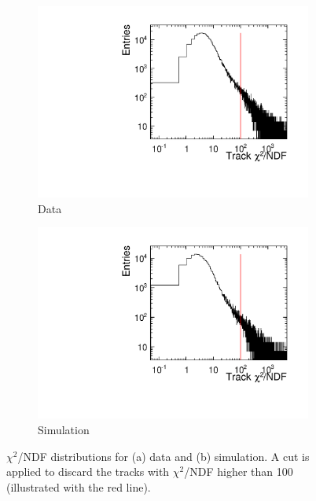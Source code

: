 \begin{figure}[htbp] \centering
  \begin{subfigure}[b]{0.45\textwidth}
    \includegraphics[width=\textwidth]{figures/Telescope/biasedResiduals/chi2_run661.pdf}
    \caption{Data}
  \end{subfigure}\hfill
  \begin{subfigure}[b]{0.45\textwidth}
    \includegraphics[width=\textwidth]{figures/Telescope/biasedResiduals/chi2_run77.pdf}
    \caption{Simulation}
  \end{subfigure}
  \caption{$\chi^2$/NDF distributions for (a) data and (b)
    simulation. A cut is applied to discard the tracks with
    $\chi^2$/NDF higher than 100 (illustrated with the red line).}
  \label{fig:chi2_data_simu}
\end{figure}

